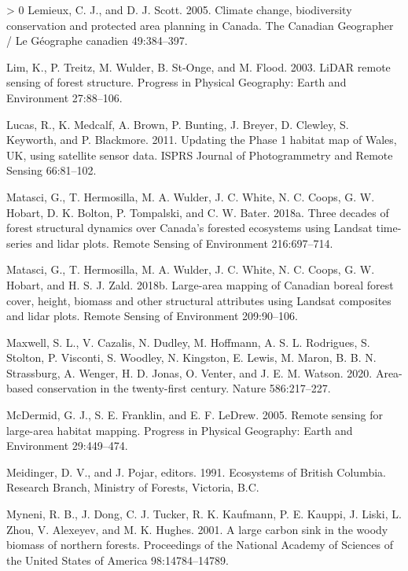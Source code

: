 \documentclass[10pt,oneside]{article}
\newlength{\cslhangindent}
\newenvironment{CSLReferences}[3] %
 {%
  \setlength{\parindent}{0pt}
  \ifodd #1 \everypar{\setlength{\hangindent}{\cslhangindent}}\ignorespaces\fi
  \ifnum #2 > 0
  \setlength{\parskip}{#2\baselineskip}
  \fi
 }%
 {}
\begin{document}
\begin{CSLReferences}{1}{0}
\leavevmode\hypertarget{ref-lemieux2005}{}%
Lemieux, C. J., and D. J. Scott. 2005. Climate change, biodiversity
conservation and protected area planning in Canada. The Canadian
Geographer / Le Géographe canadien 49:384--397.

\leavevmode\hypertarget{ref-lim2003}{}%
Lim, K., P. Treitz, M. Wulder, B. St-Onge, and M. Flood. 2003. LiDAR
remote sensing of forest structure. Progress in Physical Geography:
Earth and Environment 27:88--106.

\leavevmode\hypertarget{ref-lucas2011}{}%
Lucas, R., K. Medcalf, A. Brown, P. Bunting, J. Breyer, D. Clewley, S.
Keyworth, and P. Blackmore. 2011. Updating the Phase 1 habitat map of
Wales, UK, using satellite sensor data. ISPRS Journal of Photogrammetry
and Remote Sensing 66:81--102.

\leavevmode\hypertarget{ref-matasciThreeDecadesForest2018}{}%
Matasci, G., T. Hermosilla, M. A. Wulder, J. C. White, N. C. Coops, G.
W. Hobart, D. K. Bolton, P. Tompalski, and C. W. Bater. 2018a. Three
decades of forest structural dynamics over Canada's forested ecosystems
using Landsat time-series and lidar plots. Remote Sensing of Environment
216:697--714.

\leavevmode\hypertarget{ref-matasciLargeareaMappingCanadian2018}{}%
Matasci, G., T. Hermosilla, M. A. Wulder, J. C. White, N. C. Coops, G.
W. Hobart, and H. S. J. Zald. 2018b. Large-area mapping of Canadian
boreal forest cover, height, biomass and other structural attributes
using Landsat composites and lidar plots. Remote Sensing of Environment
209:90--106.

\leavevmode\hypertarget{ref-maxwell2020}{}%
Maxwell, S. L., V. Cazalis, N. Dudley, M. Hoffmann, A. S. L. Rodrigues,
S. Stolton, P. Visconti, S. Woodley, N. Kingston, E. Lewis, M. Maron, B.
B. N. Strassburg, A. Wenger, H. D. Jonas, O. Venter, and J. E. M.
Watson. 2020. Area-based conservation in the twenty-first century.
Nature 586:217--227.

\leavevmode\hypertarget{ref-mcdermid2005}{}%
McDermid, G. J., S. E. Franklin, and E. F. LeDrew. 2005. Remote sensing
for large-area habitat mapping. Progress in Physical Geography: Earth
and Environment 29:449--474.

\leavevmode\hypertarget{ref-meidingerEcosystemsBritishColumbia1991}{}%
Meidinger, D. V., and J. Pojar, editors. 1991. Ecosystems of British
Columbia. Research Branch, Ministry of Forests, Victoria, B.C.

\leavevmode\hypertarget{ref-myneni2001}{}%
Myneni, R. B., J. Dong, C. J. Tucker, R. K. Kaufmann, P. E. Kauppi, J.
Liski, L. Zhou, V. Alexeyev, and M. K. Hughes. 2001. A large carbon sink
in the woody biomass of northern forests. Proceedings of the National
Academy of Sciences of the United States of America 98:14784--14789.


\end{CSLReferences}
\end{document}
